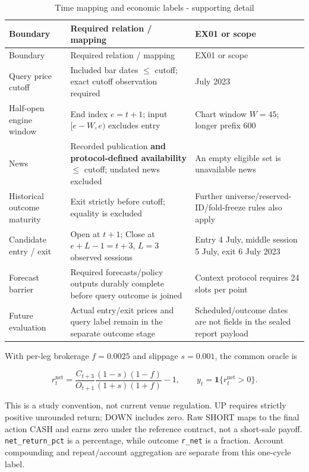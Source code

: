 \begin{longtable}[]{@{}
  >{\raggedright\arraybackslash}p{}
  >{\raggedright\arraybackslash}p{}
  >{\raggedright\arraybackslash}p{}@{}}
\caption{Time mapping and economic labels - supporting detail}\label{tab:A_contracts:3}\tabularnewline
\toprule\noalign{}
Boundary
 & Required relation / mapping
 & EX01 or scope
 \\
\midrule\noalign{}
\endfirsthead
\toprule\noalign{}
Boundary
 & Required relation / mapping
 & EX01 or scope
 \\
\midrule\noalign{}
\endhead
\bottomrule\noalign{}
\endlastfoot
Query price cutoff & Included bar dates \ensuremath{\leq} cutoff; exact cutoff observation required & 3 July 2023 \\
Half-open engine window & End index \(e=t+1\); input \([e-W,e)\) excludes entry & Chart window \(W=45\); longer prefix 600 \\
News & Recorded publication \textbf{and protocol-defined availability} \ensuremath{\leq} cutoff; undated news excluded & An empty eligible set is unavailable news \\
Historical outcome maturity & Exit strictly before cutoff; equality is excluded & Further universe/reserved-ID/fold-freeze rules also apply \\
Candidate entry / exit & Open at \(t+1\); Close at \(e+L-1=t+3\), \(L=3\) observed sessions & Entry 4 July, middle session 5 July, exit 6 July 2023 \\
Forecast barrier & Required forecasts/policy outputs durably complete before query outcome is joined & Context protocol requires 24 slots per point \\
Future evaluation & Actual entry/exit prices and query label remain in the separate outcome stage & Scheduled/outcome dates are not fields in the sealed report payload \\
\end{longtable}

\endgroup

With per-leg brokerage \(f=0.0025\) and slippage \(s=0.001\), the common oracle is

\[
r_t^{\mathrm{net}}=\frac{C_{t+3}}{O_{t+1}}
\frac{(1-s)(1-f)}{(1+s)(1+f)}-1,
\qquad y_t=\mathbf1\{r_t^{\mathrm{net}}>0\}.
\]

This is a study convention, not current venue regulation. UP requires
strictly positive unrounded return; DOWN includes zero. Raw SHORT maps to
the final action CASH and earns zero under the reference contract, not a
short-sale payoff. \texttt{net\_\allowbreak{}return\_\allowbreak{}pct} is a percentage, while outcome \texttt{r\_\allowbreak{}net}
is a fraction. Account compounding and repeat/account aggregation are
separate from this one-cycle label.

